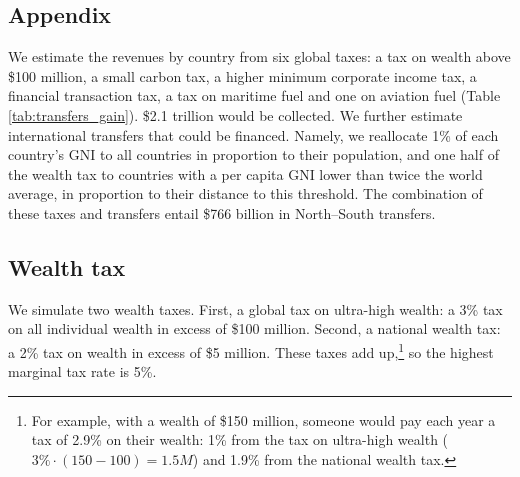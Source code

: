 \documentclass[12pt,english]{article}
\begin{document}
\begin{bibunit}

\appendix
\clearpage
\section{Appendix}

  We estimate the revenues by country from six global taxes: a tax on wealth above \$100 million, a small carbon tax, a higher minimum corporate income tax, %
  a financial transaction tax, a tax on maritime fuel and one on aviation fuel (Table \ref{tab:transfers_gain}). \$2.1 trillion would be collected. %
  We further estimate international transfers that could be financed.  %
  Namely, we reallocate 1\% of each country's GNI to all countries in proportion to their %
  population, and one half of the wealth tax to countries with a per capita GNI lower than twice the world average, in proportion to their distance to this threshold. The combination of these taxes and transfers entail \$766 billion in North--South transfers.  


\subsection{Wealth tax}\label{sec:wealth}


We simulate two wealth taxes. First, a global tax on ultra-high wealth: a 3\% tax on all individual wealth in excess of \$100 million. Second, a national wealth tax: a 2\% tax on wealth in excess of \$5 million. These taxes add up,\footnote{For example, with a wealth of \$150 million, someone would pay each year a tax of 2.9\% on their wealth: 1\% from the tax on ultra-high wealth ($3\% \cdot \left(150-100\right)=1.5M$) and 1.9\% from the national wealth tax.%
} so the highest marginal tax rate is 5\%.



\end{bibunit}
\end{document}
